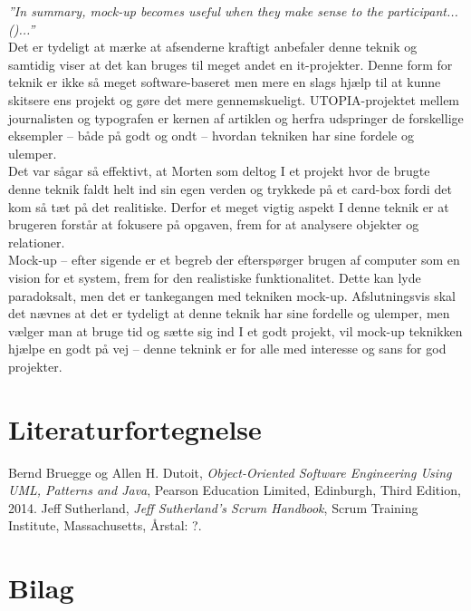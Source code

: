 \documentclass[12pt]{article}   %
\begin{document}
\noindent \emph{”In summary, mock-up becomes useful when they make sense to the participant...()...”}\\

\noindent Det er tydeligt at mærke at afsenderne kraftigt anbefaler denne teknik og samtidig viser at det kan bruges til meget andet en it-projekter. Denne form for teknik er ikke så meget software-baseret men mere en slags hjælp til at kunne skitsere ens projekt og gøre det mere gennemskueligt. UTOPIA-projektet mellem journalisten og typografen er kernen af artiklen og herfra udspringer de forskellige eksempler – både på godt og ondt – hvordan tekniken har sine fordele og ulemper. \\
Det var sågar så effektivt, at Morten som deltog I et projekt hvor de brugte denne teknik faldt helt ind sin egen verden og trykkede på et card-box fordi det kom så tæt på det realitiske.  Derfor et meget vigtig aspekt I denne teknik er at brugeren forstår at fokusere på opgaven, frem for at analysere objekter og relationer. \\
Mock-up – efter sigende er et begreb der efterspørger brugen af computer  som en vision for et system, frem for den realistiske funktionalitet. Dette kan lyde paradoksalt, men det er tankegangen med tekniken mock-up.  Afslutningsvis  skal det nævnes at det er tydeligt at denne teknik har sine fordelle og ulemper, men vælger man at bruge tid og sætte sig ind I et godt projekt, vil mock-up teknikken hjælpe en godt på vej – denne teknink er for alle med interesse og sans for god projekter. 



\pagebreak

\section{Literaturfortegnelse}
\begin{thebibliography}{9}
		Bernd Bruegge og Allen H. Dutoit,
		\emph{Object-Oriented Software Engineering Using UML, Patterns
		and Java},
		Pearson Education Limited, Edinburgh,
		Third Edition,
		2014.
		Jeff Sutherland,
		\emph{Jeff Sutherland's Scrum Handbook},
		Scrum Training Institute, Massachusetts,
		Årstal: ?.


\end{thebibliography}

\newpage

\section{Bilag}
\end{document}
